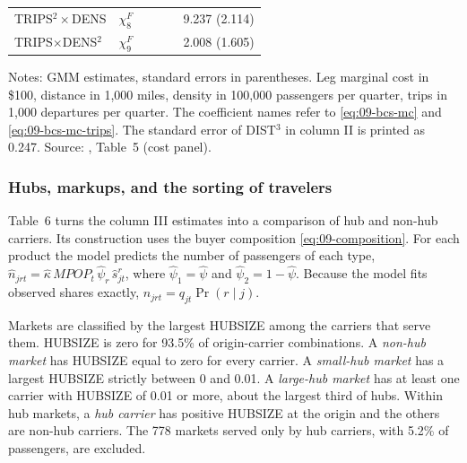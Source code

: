 \begin{table}[htbp]
\begin{threeparttable}
\begin{tabular}{@{}llcccc@{}}
TRIPS$^2\times$DENS & $\chi^F_8$ & & & & 9.237 (2.114) \\
TRIPS$\times$DENS$^2$ & $\chi^F_9$ & & & & 2.008 (1.605) \\
\bottomrule
\end{tabular}
\begin{tablenotes}\footnotesize
\item Notes: GMM estimates, standard errors in parentheses. Leg marginal cost in \$100, distance in 1,000
miles, density in 100,000 passengers per quarter, trips in 1,000 departures per quarter. The coefficient
names refer to \eqref{eq:09-bcs-mc} and \eqref{eq:09-bcs-mc-trips}. The standard error of DIST$^3$ in
column II is printed as 0.247. Source: \citet{BerryCarnallSpiller1996}, Table~5 (cost panel).
\end{tablenotes}
\end{threeparttable}
\end{table}

\subsubsection{Hubs, markups, and the sorting of travelers}

Table~6 turns the column III estimates into a comparison of hub and non-hub carriers. Its construction uses
the buyer composition \eqref{eq:09-composition}. For each product the model predicts the number of passengers
of each type, $\hat n_{jrt}=\hat\kappa\,\mathit{MPOP}_t\,\hat\psi_r\,\hat s^r_{jt}$, where $\hat\psi_1=\hat\psi$
and $\hat\psi_2=1-\hat\psi$. Because the model fits observed shares exactly, $\hat n_{jrt}=q_{jt}\Pr(r\mid j)$.

Markets are classified by the largest HUBSIZE among the carriers that serve them. HUBSIZE is zero for 93.5\%
of origin-carrier combinations. A \emph{non-hub market} has HUBSIZE equal to zero for every carrier. A
\emph{small-hub market} has a largest HUBSIZE strictly between 0 and 0.01. A \emph{large-hub market} has at
least one carrier with HUBSIZE of 0.01 or more, about the largest third of hubs. Within hub markets, a
\emph{hub carrier} has positive HUBSIZE at the origin and the others are non-hub carriers. The 778 markets
served only by hub carriers, with 5.2\% of passengers, are excluded.

